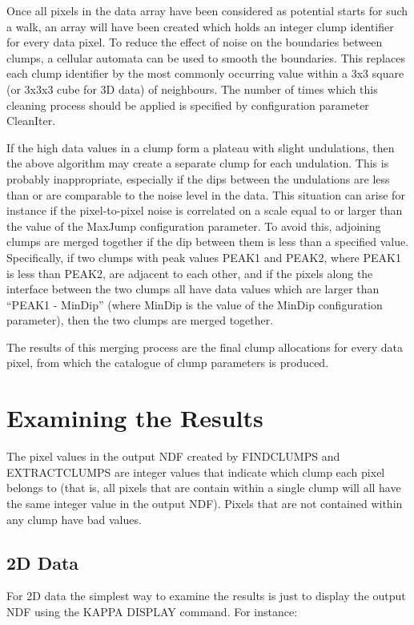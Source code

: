 \documentclass[twoside,11pt]{article}
\newcommand{\htmlref}[2]{#1}
\newcommand{\xref}[3]{#1}
\renewcommand{\_}{\texttt{\symbol{95}}}
\begin{document}
Once all pixels in the data array have been considered as potential
starts for such a walk, an array will have been created which holds an
integer clump identifier for every data pixel. To reduce the effect of
noise on the boundaries between clumps, a cellular automata can be used
to smooth the boundaries. This replaces each clump identifier by the most
commonly occurring value within a 3x3 square (or 3x3x3 cube for 3D data)
of neighbours. The number of times which this cleaning process should be
applied is specified by configuration parameter CleanIter. 

If the high data values in a clump form a plateau with slight
undulations, then the above algorithm may create a separate clump for
each undulation. This is probably inappropriate, especially if the dips
between the undulations are less than or are comparable to the noise
level in the data. This situation can arise for instance if the
pixel-to-pixel noise is correlated on a scale equal to or larger than the
value of the MaxJump configuration parameter. To avoid this, adjoining
clumps are merged together if the dip between them is less than a
specified value. Specifically, if two clumps with peak values PEAK1 and
PEAK2, where PEAK1 is less than PEAK2, are adjacent to each other, and if
the pixels along the interface between the two clumps all have data
values which are larger than ``PEAK1 - MinDip'' (where MinDip is the
value of the MinDip configuration parameter), then the two clumps are
merged together.

The results of this merging process are the final clump allocations for
every data pixel, from which the catalogue of clump parameters is
produced.

\section{Examining the Results}


The pixel values in the output NDF created by \htmlref{FINDCLUMPS}{FINDCLUMPS} 
and \htmlref{EXTRACTCLUMPS}{EXTRACTCLUMPS} are integer values that
indicate which clump each pixel belongs to (that is, all pixels that are
contain within a single clump will all have the same integer value in the
output NDF). Pixels that are not contained within any clump have bad
values. 


\subsection{2D Data}
For 2D data the simplest way to examine the results is just
to display the output NDF using the KAPPA \xref{DISPLAY}{sun95}{DISPLAY} 
command. For instance:
\end{document}
